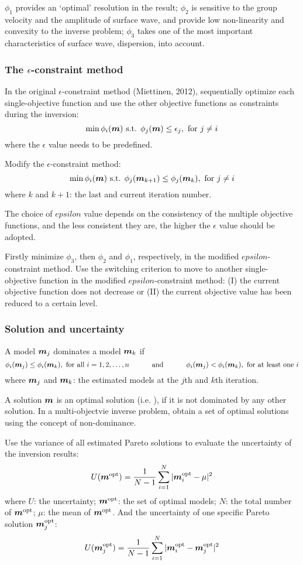 $\phi_1$ provides an `optimal' resolution in the result;
$\phi_2$ is sensitive to the group velocity and the amplitude of surface wave,
and provide low non-linearity and convexity to the inverse problem;
$\phi_3$ takes one of the most important characteristics of surface wave,
dispersion, into account.

\subsubsection{The $\epsilon$-constraint method}
In the original $\epsilon$-constraint method (Miettinen, 2012),
sequentially optimize each single-objective function and
use the other objective functions as constraints during the inversion:
\[ \min \phi_i(\boldsymbol{m}) \text{ s.t. } \phi_j(\boldsymbol{m}) \leq \epsilon_j,
  \text{ for } j \neq i \]
where the $\epsilon$ value needs to be predefined.

Modify the $\epsilon$-constraint method:
\[ \min \phi_i(\boldsymbol{m}) \text{ s.t. } \phi_j(\boldsymbol{m}_{k + 1})
  \leq \phi_j(\boldsymbol{m}_k), \text{ for } j \neq i \]
where $k$ and $k + 1$: the last and current iteration number.

The choice of $epsilon$ value depends on the consistency of
the multiple objective functions,
and the less consistent they are,
the higher the $\epsilon$ value should be adopted.

Firstly minimize $\phi_3$, then $\phi_2$ and $\phi_1$, respectively,
in the modified $epsilon$-constraint method.
Use the switching criterion to move to another single-objective function
in the modified $epsilon$-constraint method:
(I) the current objective function does not decrease or
(II) the current objective value has been reduced to a certain level.

\subsubsection{Solution and uncertainty}
A model $\boldsymbol{m}_j$ dominates a model $\boldsymbol{m}_k$ if
\[ \phi_i(\mbf m_j) \leq \phi_i(\mbf m_k), \text{ for all } i = 1, 2, \ldots, n
  \text{\hspace{10mm} and \hspace{10mm}}
  \phi_i(\mbf m_j) < \phi_i(\mbf m_k), \text{ for at least one } i \]
where $\boldsymbol{m}_j$ and $\boldsymbol{m}_k$: the estimated models
at the $j$th and $k$th iteration.

A solution $\boldsymbol{m}$ is an optimal solution (i.e. 
),
if it is not dominated by any other solution.
In a multi-objectvie inverse problem, obtain a set of optimal solutions 
using the concept of non-dominance.

Use the variance of all estimated Pareto solutions to evaluate
the uncertainty of the inversion results:
\[ U(\boldsymbol{m}^\text{opt}) = \frac{1}{N - 1} \sum_{i = 1}^N
  | \boldsymbol{m}_i^\text{opt} - \mu |^2 \]
where $U$: the uncertainty; $\boldsymbol{m}^\text{opt}$: the set of optimal models;
$N$: the total number of $\boldsymbol{m}^\text{opt}$;
$\mu$: the mean of $\boldsymbol{m}^\text{opt}$.
And the uncertainty of one specific Pareto solution $\boldsymbol{m}_j^\text{opt}$:
\[ U(\boldsymbol{m}_j^\text{opt}) = \frac{1}{N - 1} \sum_{i = 1}^N
  | \boldsymbol{m}_i^\text{opt} - \boldsymbol{m}_j^\text{opt} |^2 \]
